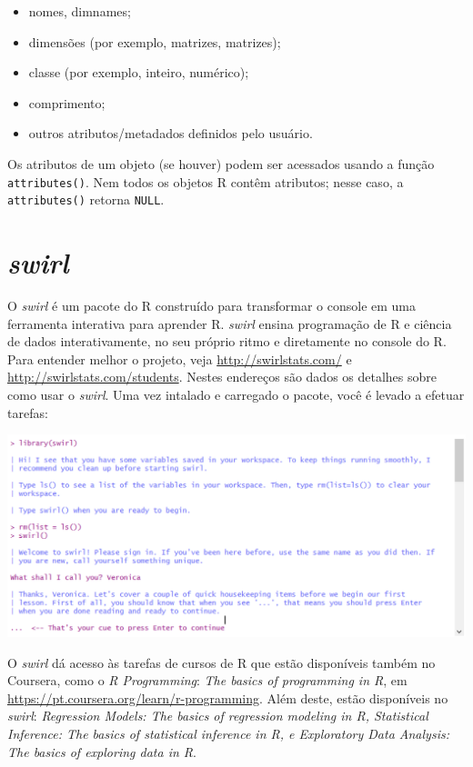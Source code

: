 \documentclass[]{book}
\begin{document}
\begin{itemize}
\item
  nomes, dimnames;
\item
  dimensões (por exemplo, matrizes, matrizes);
\item
  classe (por exemplo, inteiro, numérico);
\item
  comprimento;
\item
  outros atributos/metadados definidos pelo usuário.
\end{itemize}

Os atributos de um objeto (se houver) podem ser acessados usando a função \texttt{attributes()}. Nem todos os objetos R contêm atributos; nesse caso, a \texttt{attributes()} retorna \texttt{NULL}.

\hypertarget{swirl}{%
\section{\texorpdfstring{\emph{swirl}}{swirl}}\label{swirl}}

O \emph{swirl} é um pacote do R construído para transformar o console em uma ferramenta interativa para aprender R. \emph{swirl} ensina programação de R e ciência de dados interativamente, no seu próprio ritmo e diretamente no console do R. Para entender melhor o projeto, veja \url{http://swirlstats.com/} e \url{http://swirlstats.com/students}. Nestes endereços são dados os detalhes sobre como usar o \emph{swirl}. Uma vez intalado e carregado o pacote, você é levado a efetuar tarefas:

\begin{center}\includegraphics[width=0.9\linewidth]{imagens/swirl} \end{center}

O \emph{swirl} dá acesso às tarefas de cursos de R que estão disponíveis também no Coursera, como o \emph{R Programming}: \emph{The basics of programming in R}, em \url{https://pt.coursera.org/learn/r-programming}. Além deste, estão
disponíveis no \emph{swirl}: \emph{Regression Models: The basics of regression modeling in R, Statistical Inference: The basics of statistical inference in R, e Exploratory Data Analysis: The basics of exploring data in R}.
\end{document}
